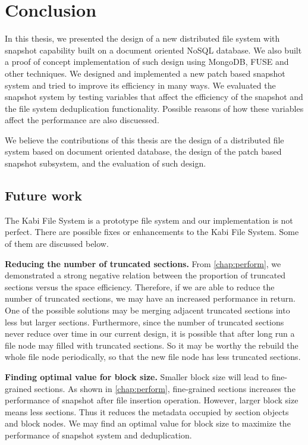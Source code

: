 \chapter{Conclusion}
\label{chap:conclusion}

    In this thesis, we presented the design of a new distributed file system with snapshot capability built on a document oriented NoSQL database. We also built a proof of concept implementation of such design using MongoDB, FUSE and other techniques. We designed and implemented a new patch based snapshot system and tried to improve its efficiency in many ways. We evaluated the snapshot system by testing variables that affect the efficiency of the snapshot and the file system deduplication functionality. Possible reasons of how these variables affect the performance are also discuessed.

    We believe the contributions of this thesis are the design of a distributed file system based on document oriented database, the design of the patch based snapshot subsystem, and the evaluation of such design.

\section{Future work}

    The Kabi File System is a prototype file system and our implementation is not perfect. There are possible fixes or enhancements to the Kabi File System. Some of them are discussed below.    

    \textbf{Reducing the number of truncated sections.} From \cref{chap:perform}, we demonstrated a strong negative relation between the proportion of truncated sections versus the space efficiency. Therefore, if we are able to reduce the number of truncated sections, we may have an increased performance in return. One of the possible solutions may be merging adjacent truncated sections into less but larger sections. Furthermore, since the number of truncated sections never reduce over time in our current design, it is possible that after long run a file node may filled with truncated sections. So it may be worthy the rebuild the whole file node periodically, so that the new file node has less truncated sections.
    
    \textbf{Finding optimal value for block size.} Smaller block size will lead to fine-grained sections. As shown in \cref{chap:perform}, fine-grained sections increases the performance of snapshot after file insertion operation. However, larger block size means less sections. Thus it reduces the metadata occupied by section objects and block nodes. We may find an optimal value for block size to maximize the performance of snapshot system and deduplication.


